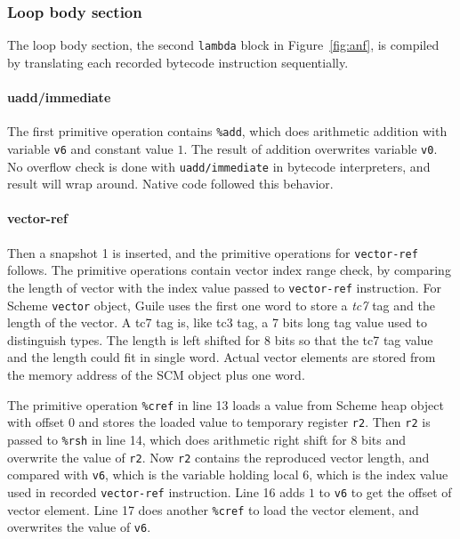 \documentclass[preprint, 10pt]{sigplanconf}
\begin{document}
\subsubsection{Loop body section}

The loop body section, the second \texttt{lambda} block in
Figure~\hyperref[fig:anf]{\ref{fig:anf}}, is compiled by translating each
recorded bytecode instruction sequentially.

\paragraph{uadd/immediate} The first primitive operation contains
\texttt{\%add}, which does arithmetic addition with variable \texttt{v6} and
constant value $1$. The result of addition overwrites variable \texttt{v0}. No
overflow check is done with \texttt{uadd/immediate} in bytecode interpreters,
and result will wrap around. Native code followed this behavior.

\paragraph{vector-ref} Then a snapshot 1 is inserted, and
the primitive operations for \texttt{vector-ref} follows. The primitive
operations contain vector index range check, by comparing the length of vector
with the index value passed to \texttt{vector-ref} instruction. For Scheme
\texttt{vector} object, Guile uses the first one word to store a \textit{tc7}
tag and the length of the vector. A tc7 tag is, like tc3 tag, a 7 bits long
tag value used to distinguish types. The length is left shifted for 8 bits so
that the tc7 tag value and the length could fit in single word. Actual vector
elements are stored from the memory address of the SCM object plus one word.

The primitive operation \texttt{\%cref} in line 13 loads a value from Scheme
heap object with offset 0 and stores the loaded value to temporary register
\texttt{r2}. Then \texttt{r2} is passed to \texttt{\%rsh} in line 14, which
does arithmetic right shift for 8 bits and overwrite the value of
\texttt{r2}. Now \texttt{r2} contains the reproduced vector length, and
compared with \texttt{v6}, which is the variable holding local 6, which is the
index value used in recorded \texttt{vector-ref} instruction. Line 16 adds $1$
to \texttt{v6} to get the offset of vector element. Line 17 does another
\texttt{\%cref} to load the vector element, and overwrites the value of
\texttt{v6}.
\end{document}
